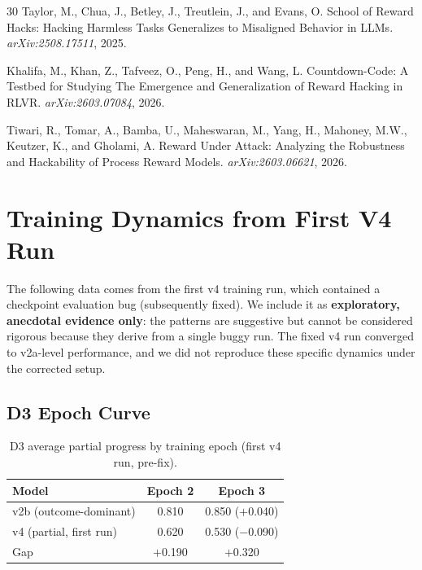 \documentclass[11pt]{article}
\begin{document}
\begin{thebibliography}{30}
Taylor, M., Chua, J., Betley, J., Treutlein, J., and Evans, O.
\newblock School of Reward Hacks: Hacking Harmless Tasks Generalizes to Misaligned Behavior in LLMs.
\newblock \emph{arXiv:2508.17511}, 2025.

Khalifa, M., Khan, Z., Tafveez, O., Peng, H., and Wang, L.
\newblock Countdown-Code: A Testbed for Studying The Emergence and Generalization of Reward Hacking in RLVR.
\newblock \emph{arXiv:2603.07084}, 2026.

Tiwari, R., Tomar, A., Bamba, U., Maheswaran, M., Yang, H., Mahoney, M.W., Keutzer, K., and Gholami, A.
\newblock Reward Under Attack: Analyzing the Robustness and Hackability of Process Reward Models.
\newblock \emph{arXiv:2603.06621}, 2026.

\end{thebibliography}


\appendix
\section{Training Dynamics from First V4 Run}
\label{app:dynamics}

The following data comes from the first v4 training run, which contained a checkpoint evaluation bug (subsequently fixed). We include it as \textbf{exploratory, anecdotal evidence only}: the patterns are suggestive but cannot be considered rigorous because they derive from a single buggy run. The fixed v4 run converged to v2a-level performance, and we did not reproduce these specific dynamics under the corrected setup.

\subsection{D3 Epoch Curve}

\begin{table}[h]
\centering
\caption{D3 average partial progress by training epoch (first v4 run, pre-fix).}
\small
\begin{tabular}{@{}lcc@{}}
\toprule
\textbf{Model} & \textbf{Epoch 2} & \textbf{Epoch 3} \\
\midrule
v2b (outcome-dominant) & 0.810 & 0.850 ($+$0.040) \\
v4 (partial, first run) & 0.620 & 0.530 ($-$0.090) \\
\midrule
Gap & $+$0.190 & $+$0.320 \\
\bottomrule
\end{tabular}
\end{table}
\end{document}
